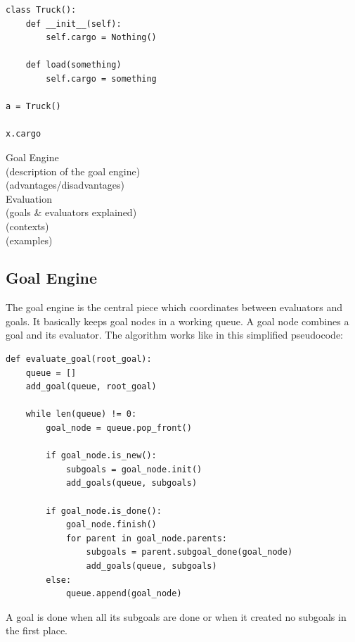\documentclass[12pt,halfparskip,DIV11,BCOR10mm]{scrreprt}
\begin{document}
\begin{lstlisting}
class Truck():
	def __init__(self):
		self.cargo = Nothing()
	
	def load(something)
		self.cargo = something

a = Truck()

x.cargo 
\end{lstlisting}


Goal Engine \\
 (description of the goal engine)\\
 (advantages/disadvantages)\\
Evaluation\\
 (goals \& evaluators explained)\\
 (contexts)\\
 (examples)


\subsection{Goal Engine}

The goal engine is the central piece which coordinates between evaluators and goals. It basically keeps goal nodes in a working queue. A goal node combines a goal and its evaluator. The algorithm works like in this simplified pseudocode:

\begin{lstlisting}
def evaluate_goal(root_goal):
    queue = []
    add_goal(queue, root_goal)

    while len(queue) != 0:
        goal_node = queue.pop_front()

        if goal_node.is_new():
            subgoals = goal_node.init()
            add_goals(queue, subgoals)

        if goal_node.is_done():
            goal_node.finish()
            for parent in goal_node.parents:
                subgoals = parent.subgoal_done(goal_node)
                add_goals(queue, subgoals)
        else:
            queue.append(goal_node)
\end{lstlisting}

A goal is done when all its subgoals are done or when it created no subgoals in the first place.


\end{document}
